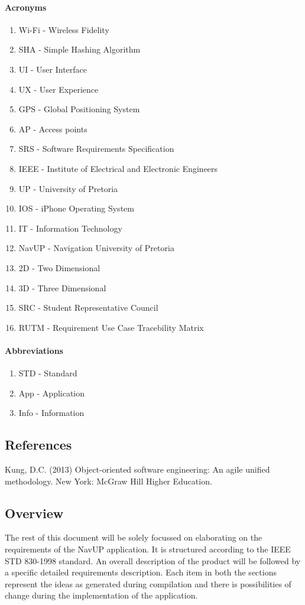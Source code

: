 \documentclass[runningheads,a4paper]{article}
\begin{document}
\paragraph{\textbf{Acronyms}}
\begin{enumerate}
	\item Wi-Fi - Wireless Fidelity 
	\item SHA - Simple Hashing Algorithm
	\item UI - User Interface
	\item UX - User Experience
	\item GPS - Global Positioning System
	\item AP - Access points
	\item SRS - Software Requirements Specification
	\item IEEE - Institute of Electrical and Electronic Engineers 
	\item UP - University of Pretoria
	\item IOS - iPhone Operating System 
	\item IT - Information Technology
	\item NavUP - Navigation University of Pretoria
	\item 2D - Two Dimensional
	\item 3D - Three Dimensional
	\item SRC - Student Representative Council
	\item RUTM - Requirement Use Case Tracebility Matrix
\end{enumerate}

\paragraph{\textbf{Abbreviations}}
\begin{enumerate}
	\item STD - Standard
	\item App - Application
	\item Info - Information
\end{enumerate}

\subsection{References}
Kung, D.C. (2013) Object-oriented software engineering: An agile unified methodology. New York: McGraw Hill Higher Education.

\subsection{Overview}
The rest of this document will be solely focussed on elaborating on the requirements of the NavUP application. It is structured according to the IEEE STD 830-1998 standard. An overall description of the product will be followed by a specific detailed requirements description. Each item in both the sections represent the ideas as generated during compilation and there is possibilities of change during the implementation of the application.
\end{document}
